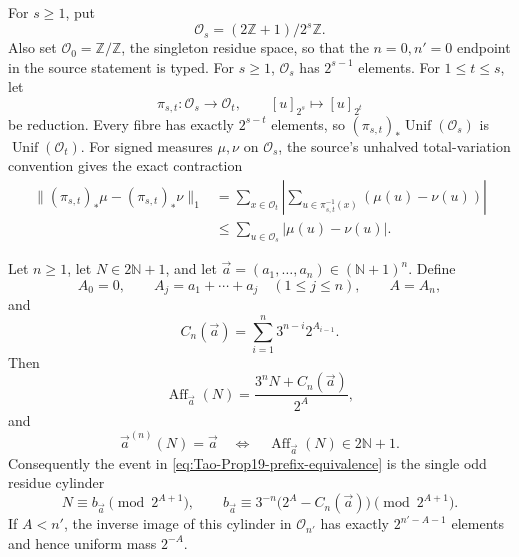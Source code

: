 For \(s\geq1\), put
\[
 \mathcal O_s=(2\mathbb Z+1)/2^s\mathbb Z.
\]
Also set \(\mathcal O_0=\mathbb Z/\mathbb Z\), the singleton residue space,
so that the \(n=0,n'=0\) endpoint in the source statement is typed.  For
\(s\geq1\), \(\mathcal O_s\) has \(2^{s-1}\) elements.  For
\(1\leq t\leq s\), let
\[
 \pi_{s,t}:\mathcal O_s\longrightarrow\mathcal O_t,
 \qquad [u]_{2^s}\longmapsto[u]_{2^t}
\]
be reduction.  Every fibre has exactly \(2^{s-t}\) elements, so
\((\pi_{s,t})_*\operatorname{Unif}(\mathcal O_s)\) is
\(\operatorname{Unif}(\mathcal O_t)\).  For signed measures \(\mu,\nu\) on
\(\mathcal O_s\), the source's unhalved total-variation convention gives the
exact contraction
\begin{equation}
\label{eq:Tao-Prop19-TV-contraction}
\begin{split}
 \| (\pi_{s,t})_*\mu-(\pi_{s,t})_*\nu\|_1
 & =\sum_{x\in\mathcal O_t}
 \left|\sum_{u\in\pi_{s,t}^{-1}(x)}(\mu(u)-\nu(u))\right|\\
 &\leq\sum_{u\in\mathcal O_s}|\mu(u)-\nu(u)|.
\end{split}
\end{equation}

\begin{lemma}
\label{lem:Tao-Prop19-residue-fibre}
Let \(n\geq1\), let \(N\in2\mathbb N+1\), and let
\(\vec a=(a_1,\ldots,a_n)\in(\mathbb N+1)^n\).  Define
\[
 A_0=0,\qquad A_j=a_1+\cdots+a_j\quad(1\leq j\leq n),
 \qquad A=A_n,
\]
and
\[
 C_n(\vec a)=\sum_{i=1}^n3^{n-i}2^{A_{i-1}}.
\]
Then
\begin{equation}
\label{eq:Tao-Prop19-affine-numerator}
 \operatorname{Aff}_{\vec a}(N)
 =\frac{3^nN+C_n(\vec a)}{2^A},
\end{equation}
and
\begin{equation}
\label{eq:Tao-Prop19-prefix-equivalence}
 \vec a^{(n)}(N)=\vec a
 \quad\Longleftrightarrow\quad
 \operatorname{Aff}_{\vec a}(N)\in2\mathbb N+1.
\end{equation}
Consequently the event in \eqref{eq:Tao-Prop19-prefix-equivalence} is the
single odd residue cylinder
\begin{equation}
\label{eq:Tao-Prop19-cylinder}
 N\equiv b_{\vec a}\pmod{2^{A+1}},
 \qquad
 b_{\vec a}\equiv
 3^{-n}\bigl(2^A-C_n(\vec a)\bigr)\pmod{2^{A+1}}.
\end{equation}
If \(A<n'\), the inverse image of this cylinder in \(\mathcal O_{n'}\) has
exactly \(2^{n'-A-1}\) elements and hence uniform mass \(2^{-A}\).
\end{lemma}

